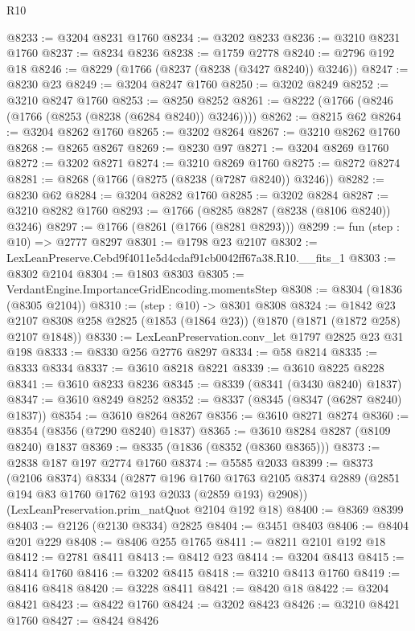 \begin{lexlean}{R10}
\begin{coremodule}
@8233 := @3204 @8231 @1760
@8234 := @3202 @8233
@8236 := @3210 @8231 @1760
@8237 := @8234 @8236
@8238 := @1759 @2778
@8240 := @2796 @192 @18
@8246 := @8229 (@1766 (@8237 (@8238 (@3427 @8240)) @3246))
@8247 := @8230 @23
@8249 := @3204 @8247 @1760
@8250 := @3202 @8249
@8252 := @3210 @8247 @1760
@8253 := @8250 @8252
@8261 := @8222 (@1766 (@8246 (@1766 (@8253 (@8238 (@6284 @8240)) @3246))))
@8262 := @8215 @62
@8264 := @3204 @8262 @1760
@8265 := @3202 @8264
@8267 := @3210 @8262 @1760
@8268 := @8265 @8267
@8269 := @8230 @97
@8271 := @3204 @8269 @1760
@8272 := @3202 @8271
@8274 := @3210 @8269 @1760
@8275 := @8272 @8274
@8281 := @8268 (@1766 (@8275 (@8238 (@7287 @8240)) @3246))
@8282 := @8230 @62
@8284 := @3204 @8282 @1760
@8285 := @3202 @8284
@8287 := @3210 @8282 @1760
@8293 := @1766 (@8285 @8287 (@8238 (@8106 @8240)) @3246)
@8297 := @1766 (@8261 (@1766 (@8281 @8293)))
@8299 := fun (step : @10) => @2777 @8297
@8301 := @1798 @23 @2107
@8302 := LexLeanPreserve.Cebd9f4011e5d4cdaf91cb0042ff67a38.R10.__fits_1
@8303 := @8302 @2104
@8304 := @1803 @8303
@8305 := VerdantEngine.ImportanceGridEncoding.momentsStep
@8308 := @8304 (@1836 (@8305 @2104))
@8310 := (step : @10) -> @8301 @8308
@8324 := @1842
    @23
    @2107
    @8308
    @258
    @2825
    (@1853 (@1864 @23))
    (@1870 (@1871 (@1872 @258) @2107 @1848))
@8330 := LexLeanPreservation.conv_let @1797 @2825 @23 @31 @198
@8333 := @8330 @256 @2776 @8297
@8334 := @58 @8214
@8335 := @8333 @8334
@8337 := @3610 @8218 @8221
@8339 := @3610 @8225 @8228
@8341 := @3610 @8233 @8236
@8345 := @8339 (@8341 (@3430 @8240) @1837)
@8347 := @3610 @8249 @8252
@8352 := @8337 (@8345 (@8347 (@6287 @8240) @1837))
@8354 := @3610 @8264 @8267
@8356 := @3610 @8271 @8274
@8360 := @8354 (@8356 (@7290 @8240) @1837)
@8365 := @3610 @8284 @8287 (@8109 @8240) @1837
@8369 := @8335 (@1836 (@8352 (@8360 @8365)))
@8373 := @2838 @187 @197 @2774 @1760
@8374 := @5585 @2033
@8399 := @8373
    (@2106 @8374)
    @8334
    (@2877
      @196
      @1760
      @1763
      @2105
      @8374
      @2889
      (@2851 @194 @83 @1760 @1762 @193 @2033 (@2859 @193) @2908))
    (LexLeanPreservation.prim_natQuot @2104 @192 @18)
@8400 := @8369 @8399
@8403 := @2126 (@2130 @8334) @2825
@8404 := @3451 @8403
@8406 := @8404 @201 @229
@8408 := @8406 @255 @1765
@8411 := @8211 @2101 @192 @18
@8412 := @2781 @8411
@8413 := @8412 @23
@8414 := @3204 @8413
@8415 := @8414 @1760
@8416 := @3202 @8415
@8418 := @3210 @8413 @1760
@8419 := @8416 @8418
@8420 := @3228 @8411
@8421 := @8420 @18
@8422 := @3204 @8421
@8423 := @8422 @1760
@8424 := @3202 @8423
@8426 := @3210 @8421 @1760
@8427 := @8424 @8426

\end{coremodule}
\end{lexlean}
